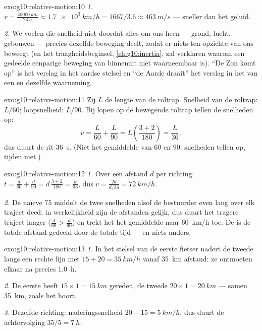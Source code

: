 \begin{solution}{exo:g10:relative-motion:10}
\emph{1.} $v = \frac{\qty{40000}{km}}{\qty{24}{h}}
\approx \qty{1.7e3}{km/h} = 1667/3.6 \approx \qty{463}{m/s}$ --- sneller
dan het geluid.

\emph{2.} We voelen die snelheid niet doordat alles om ons heen ---
grond, lucht, gebouwen --- precies dezelfde beweging deelt, zodat er
niets ten opzichte van ons beweegt (en het traagheidsbeginsel,
\cref{ch:g10:inertia}, zal verklaren waarom een gedeelde eenparige
beweging van binnenuit niet waarneembaar is). ``De Zon komt op'' is het
verslag in het aardse stelsel en ``de Aarde draait'' het verslag in het
 van een en dezelfde waarneming.
\end{solution}

\begin{solution}{exo:g10:relative-motion:11}
Zij $L$ de lengte van de roltrap. Snelheid van de roltrap: $L/60$;
loopsnelheid: $L/90$. Bij lopen op de bewegende roltrap tellen de
snelheden op:
\[
v = \frac{L}{60} + \frac{L}{90} = L\left(\frac{3 + 2}{180}\right)
= \frac{L}{36},
\]
dus duurt de rit \qty{36}{s}. (Niet het gemiddelde van $60$ en $90$:
snelheden tellen op, tijden niet.)
\end{solution}

\begin{solution}{exo:g10:relative-motion:12}
\emph{1.} Over een afstand $d$ per richting:
$t = \frac{d}{60} + \frac{d}{90} = d\,\frac{3 + 2}{180} = \frac{d}{36}$,
dus $v = \frac{2d}{d/36} = \qty{72}{km/h}$.

\emph{2.} De naïeve $75$ middelt de twee snelheden alsof de bestuurder
even lang over elk traject deed; in werkelijkheid zijn de afstanden
gelijk, dus duurt het tragere traject langer ($\frac{d}{60} >
\frac{d}{90}$) en trekt het het gemiddelde naar \qty{60}{km/h} toe. De
 is de totale afstand gedeeld door de totale tijd ---
en niets anders.
\end{solution}

\begin{solution}{exo:g10:relative-motion:13}
\emph{1.} In het stelsel van de eerste fietser nadert de tweede langs
een rechte lijn met $15 + 20 = \qty{35}{km/h}$ vanaf \qty{35}{km}
afstand: ze ontmoeten elkaar na precies \qty{1.0}{h}.

\emph{2.} De eerste heeft $15 \times 1 = \qty{15}{km}$ gereden, de
tweede $20 \times 1 = \qty{20}{km}$ --- samen \qty{35}{km}, zoals het
hoort.

\emph{3.} Dezelfde richting: naderingssnelheid $20 - 15 = \qty{5}{km/h}$,
dus duurt de achtervolging $35/5 = \qty{7}{h}$.
\end{solution}

